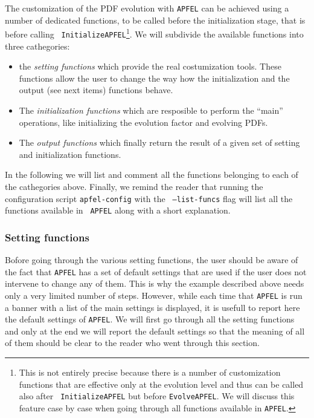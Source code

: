 \documentclass[11pt,a4paper]{article}
\begin{document}
The customization of the PDF evolution with {\tt APFEL} can be
achieved using a number of dedicated functions, to be called before
the initialization stage, that is before calling {\tt
  InitializeAPFEL}\footnote{This is not entirely precise because there
  is a number of customization functions that are effective only at
  the evolution level and thus can be called also after {\tt
    InitializeAPFEL} but before {\tt EvolveAPFEL}. We will discuss
  this feature case by case when going through all functions available
  in {\tt APFEL}.}. We will subdivide the available functions into
three cathegories:
\begin{itemize}
\item the \textit{setting functions} which provide the real
  costumization tools. These functions allow the user to change the
  way how the initialization and the output (see next items) functions
  behave.
\item The \textit{initialization functions} which are resposible to
  perform the ``main'' operations, like initializing the evolution
  factor and evolving PDFs.
\item The \textit{output functions} which finally return the result of
  a given set of setting and initialization functions.
\end{itemize}
In the following we will list and comment all the functions belonging
to each of the cathegories above. Finally, we remind the reader
that running the configuration script {\tt apfel-config} with the {\tt
  --list-funcs} flag will list all the functions available in {\tt
  APFEL} along with a short explanation.

\subsubsection{Setting functions}

Bofore going through the various setting functions, the user should be
aware of the fact that {\tt APFEL} has a set of default settings that
are used if the user does not intervene to change any of them. This is
why the example described above needs only a very limited number of
steps. However, while each time that {\tt APFEL} is run a banner with
a list of the main settings is displayed, it is usefull to report here
the default settings of {\tt APFEL}. We will first go through all the
setting functions and only at the end we will report the default
settings so that the meaning of all of them should be clear to the
reader who went through this section. 
\end{document}
